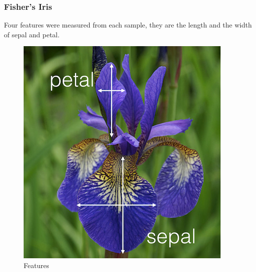\documentclass{beamer}
\begin{document}
\begin{frame}
\frametitle{Fisher's Iris}
Four features were measured from each
sample, they are the length and the width of sepal and petal.
\begin{figure}[htbp]
\centering
\includegraphics[scale=.35]{graphics/iris_feature} \caption{Features}
\label{fig:Features}
\end{figure}
\end{frame}
\end{document}
